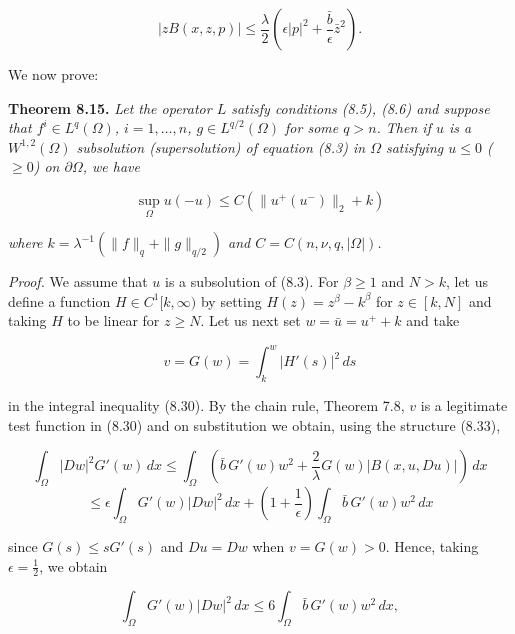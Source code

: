 \begin{equation*}
|zB(x,z,p)| \le \frac{\lambda}{2}\left(\epsilon |p|^2 + \frac{\bar b}{\epsilon}\bar z^2\right).
\end{equation*}

We now prove:

\textbf{Theorem 8.15.} \textit{Let the operator $L$ satisfy conditions (8.5), (8.6) and suppose that $f^i \in L^q(\Omega)$, $i = 1,\ldots,n$, $g \in L^{q/2}(\Omega)$ for some $q>n$. Then if $u$ is a $W^{1,2}(\Omega)$ subsolution (supersolution) of equation (8.3) in $\Omega$ satisfying $u \le 0$ ($\ge 0$) on $\partial\Omega$, we have}

\begin{equation}\tag{8.34}
\sup_{\Omega} u(-u) \le C(\|u^+(u^-)\|_2 + k)
\end{equation}

\textit{where $k = \lambda^{-1}(\|f\|_q + \|g\|_{q/2})$ and $C = C(n,\nu,q,|\Omega|)$.}

\textit{Proof.} We assume that $u$ is a subsolution of (8.3). For $\beta \ge 1$ and $N > k$, let us define a function $H \in C^1[k,\infty)$ by setting $H(z) = z^\beta - k^\beta$ for $z \in [k,N]$ and taking $H$ to be linear for $z \ge N$. Let us next set $w = \bar u = u^+ + k$ and take

\begin{equation}\tag{8.35}
v = G(w) = \int_k^w |H'(s)|^2\,ds
\end{equation}

in the integral inequality (8.30). By the chain rule, Theorem 7.8, $v$ is a legitimate test function in (8.30) and on substitution we obtain, using the structure (8.33),

\begin{equation*}
\int_{\Omega} |Dw|^2 G'(w)\,dx \le \int_{\Omega} \left(\bar b\,G'(w)w^2 + \frac{2}{\lambda} G(w)|B(x,u,Du)|\right)\,dx
\end{equation*}
\begin{equation*}
\le \epsilon \int_{\Omega} G'(w)|Dw|^2\,dx + \left(1 + \frac{1}{\epsilon}\right)\int_{\Omega} \bar b\,G'(w)w^2\,dx
\end{equation*}

since $G(s) \le sG'(s)$ and $Du = Dw$ when $v = G(w) > 0$. Hence, taking $\epsilon = \frac12$, we obtain

\begin{equation*}
\int_{\Omega} G'(w)|Dw|^2\,dx \le 6 \int_{\Omega} \bar b\,G'(w)w^2\,dx,
\end{equation*}

